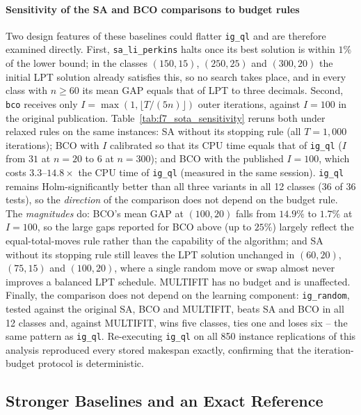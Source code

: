 \documentclass[final,3p,times,11pt,authoryear]{elsarticle}
\begin{document}
\paragraph{Sensitivity of the SA and BCO comparisons to budget rules}
Two design features of these baselines could flatter \texttt{ig\_ql}
and are therefore examined directly. First, \texttt{sa\_li\_perkins}
halts once its best solution is within $1\%$ of the lower bound; in
the classes $(150,15)$, $(250,25)$ and $(300,20)$ the initial LPT
solution already satisfies this, so no search takes place, and in
every class with $n \ge 60$ its mean GAP equals that of LPT to three
decimals. Second, \texttt{bco} receives only
$I = \max(1,\lfloor T/(5n)\rfloor)$ outer iterations, against $I=100$
in the original publication. Table~\ref{tab:f7_sota_sensitivity}
reruns both under relaxed rules on the same instances: SA without its
stopping rule (all $T=1{,}000$ iterations); BCO with $I$ calibrated so
that its CPU time equals that of \texttt{ig\_ql} ($I$ from $31$ at
$n=20$ to $6$ at $n=300$); and BCO with the published $I=100$, which
costs $3.3$--$14.8\times$ the CPU time of \texttt{ig\_ql} (measured in
the same session). \texttt{ig\_ql} remains Holm-significantly better
than all three variants in all 12 classes (36 of 36 tests), so the
\emph{direction} of the comparison does not depend on the budget rule.
The \emph{magnitudes} do: BCO's mean GAP at $(100,20)$ falls from
$14.9\%$ to $1.7\%$ at $I=100$, so the large gaps reported for BCO
above (up to $25\%$) largely reflect the equal-total-moves rule rather
than the capability of the algorithm; and SA without its stopping rule
still leaves the LPT solution unchanged in $(60,20)$, $(75,15)$ and
$(100,20)$, where a single random move or swap almost never improves a
balanced LPT schedule. MULTIFIT has no budget and is unaffected.
Finally, the comparison does not depend on the learning component:
\texttt{ig\_random}, tested against the original SA, BCO and MULTIFIT,
beats SA and BCO in all 12 classes and, against MULTIFIT, wins five
classes, ties one and loses six -- the same pattern as \texttt{ig\_ql}.
Re-executing \texttt{ig\_ql} on all 850 instance replications of this
analysis reproduced every stored makespan exactly, confirming that the
iteration-budget protocol is deterministic.



\subsection{Stronger Baselines and an Exact Reference}
\label{sec:exact-ref}
\end{document}

